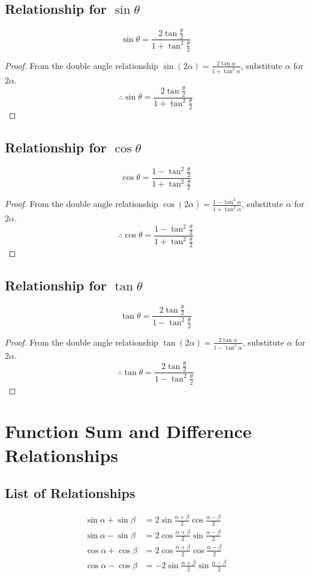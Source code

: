 \documentclass{article}
\begin{document}
\subsection{Relationship for $\sin\theta$}
    \[
    \sin\theta=\frac{2\tan\frac{\theta}{2}}{1+\tan^2\frac{\theta}{2}}
    \]
\begin{proof}
    From the double angle relationship $\sin(2\alpha)=\frac{2\tan\alpha}{1+\tan^2\alpha}$, substitute $\alpha$ for $2\alpha$.
    \[
    \therefore \sin\theta=\frac{2\tan\frac{\theta}{2}}{1+\tan^2\frac{\theta}{2}}
    \]
\end{proof}

\subsection{Relationship for $\cos\theta$}
    \[
    \cos\theta=\frac{1-\tan^2\frac{\theta}{2}}{1+\tan^2\frac{\theta}{2}}
    \]
\begin{proof}
    From the double angle relationship $\cos(2\alpha)=\frac{1-\tan^2\alpha}{1+\tan^2\alpha}$, substitute $\alpha$ for $2\alpha$.
    \[
    \therefore \cos\theta=\frac{1-\tan^2\frac{\theta}{2}}{1+\tan^2\frac{\theta}{2}}
    \]
\end{proof}

\subsection{Relationship for $\tan\theta$}
    \[
    \tan\theta=\frac{2\tan\frac{\theta}{2}}{1-\tan^2\frac{\theta}{2}}
    \]
\begin{proof}
    From the double angle relationship $\tan(2\alpha)=\frac{2\tan\alpha}{1-\tan^2\alpha}$, substitute $\alpha$ for $2\alpha$.
    \[
    \therefore \tan\theta=\frac{2\tan\frac{\theta}{2}}{1-\tan^2\frac{\theta}{2}}
    \]
\end{proof}


\section{Function Sum and Difference Relationships}
\subsection{List of Relationships}
\begin{align*}
    \sin\alpha+\sin\beta&=2\sin\frac{\alpha+\beta}{2}\cos\frac{\alpha-\beta}{2} \\
    \sin\alpha-\sin\beta&=2\cos\frac{\alpha+\beta}{2}\sin\frac{\alpha-\beta}{2} \\
    \cos\alpha+\cos\beta&=2\cos\frac{\alpha+\beta}{2}\cos\frac{\alpha-\beta}{2} \\
    \cos\alpha-\cos\beta&=-2\sin\frac{\alpha+\beta}{2}\sin\frac{\alpha-\beta}{2}
\end{align*}
\end{document}
